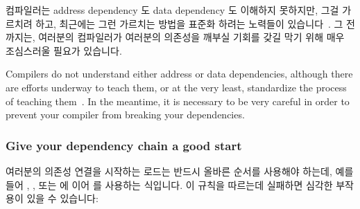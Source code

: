 컴파일러는 address dependency 도 data dependency 도 이해하지 못하지만, 그걸
가르치려 하고, 최근에는 그런 가르치는 방법을 표준화 하려는 노력들이
있습니다~\cite{PaulEMcKennneyConsumeP0190R4,PaulEMcKenney2017markconsumeP0462R1}.
그 전까지는, 여러분의 컴파일러가 여러분의 의존성을 깨부실 기회를 갖길 막기 위해
매우 조심스러울 필요가 있습니다.
\iffalse

Compilers do not understand either address or data dependencies,
although there are efforts underway to teach them, or at the very
least, standardize the process of teaching
them~\cite{PaulEMcKennneyConsumeP0190R4,PaulEMcKenney2017markconsumeP0462R1}.
In the meantime, it is necessary to be very careful in order to prevent
your compiler from breaking your dependencies.

\subsubsection{Give your dependency chain a good start}
여러분의 의존성 연결을 시작하는 로드는 반드시 올바른 순서를 사용해야 하는데,
예를 들어 , , 또는
 에 이어  를 사용하는 식입니다.
이 규칙을 따르는데 실패하면 심각한 부작용이 있을 수 있습니다:

